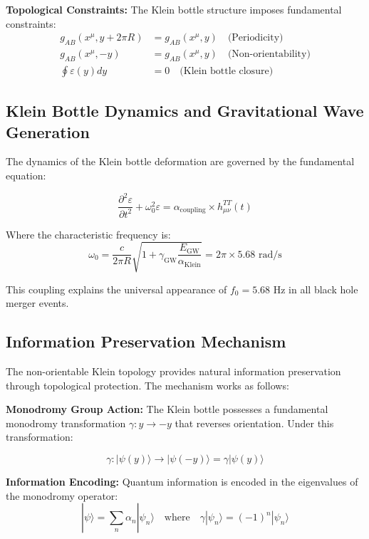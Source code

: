 \documentclass[12pt,a4paper]{article}
\newcommand{\fzero}{f_0}
\newcommand{\Klein}{\text{Klein}}
\begin{document}
\textbf{Topological Constraints:}
The Klein bottle structure imposes fundamental constraints:
\begin{align}
g_{AB}(x^\mu, y + 2\pi R) &= g_{AB}(x^\mu, y) \quad \text{(Periodicity)} \\
g_{AB}(x^\mu, -y) &= g_{AB}(x^\mu, y) \quad \text{(Non-orientability)} \\
\oint \varepsilon(y) dy &= 0 \quad \text{(Klein bottle closure)}
\end{align}

\subsection{Klein Bottle Dynamics and Gravitational Wave Generation}

The dynamics of the Klein bottle deformation are governed by the fundamental equation:

\begin{equation}
\frac{\partial^2 \varepsilon}{\partial t^2} + \omega_0^2 \varepsilon = \alpha_{\text{coupling}} \times h_{\mu\nu}^{TT}(t)
\end{equation}

Where the characteristic frequency is:
\begin{equation}
\omega_0 = \frac{c}{2\pi R} \sqrt{1 + \gamma_{\text{GW}} \frac{E_{\text{GW}}}{\alpha_{\Klein}}} = 2\pi \times 5.68 \text{ rad/s}
\end{equation}

This coupling explains the universal appearance of $\fzero = 5.68$ Hz in all black hole merger events.

\subsection{Information Preservation Mechanism}

The non-orientable Klein topology provides natural information preservation through topological protection. The mechanism works as follows:

\textbf{Monodromy Group Action:}
The Klein bottle possesses a fundamental monodromy transformation $\gamma: y \rightarrow -y$ that reverses orientation. Under this transformation:

\begin{equation}
\gamma: |\psi(y)\rangle \rightarrow |\psi(-y)\rangle = \gamma|\psi(y)\rangle
\end{equation}

\textbf{Information Encoding:}
Quantum information is encoded in the eigenvalues of the monodromy operator:
\begin{equation}
|\psi\rangle = \sum_n \alpha_n |\psi_n\rangle \quad \text{where} \quad \gamma|\psi_n\rangle = (-1)^n |\psi_n\rangle
\end{equation}
\end{document}
